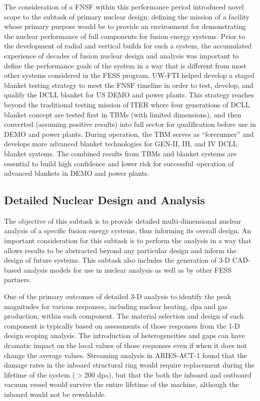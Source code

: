 The consideration of a \gls{FNSF} within this performance period introduced
novel scope to the subtask of primary nuclear design: defining the mission of
a facility whose primary purpose would be to provide an environment for
demonstrating the nuclear performance of full components for fusion energy
systems.  Prior to the development of radial and vertical builds for such a
system, the accumulated experience of decades of fusion nuclear design and
analysis was important to define the performance goals of the system in a way
that is different from most other systems considered in the \gls{FESS}
program.  \gls{UW-FTI} helped develop a staged blanket testing strategy to
meet the \gls{FNSF} timeline in order to test, develop, and qualify the
\gls{DCLL} blanket for US DEMO and power plants. This strategy reaches beyond
the traditional testing mission of ITER where four generations of \gls{DCLL}
blanket concept are tested first in \glspl{TBM} (with limited dimensions), and
then converted (assuming positive results) into full sector for qualification
before use in DEMO and power plants. During operation, the \gls{TBM} serves as
“forerunner” and develops more advanced blanket technologies for GEN-II, III,
and IV \gls{DCLL} blanket systems.  The combined results from \glspl{TBM} and
blanket systems are essential to build high confidence and lower risk for
successful operation of advanced blankets in DEMO and power plants.

\subsection{Detailed Nuclear Design and Analysis}

The objective of this subtask is to provide detailed multi-dimensional nuclear
analysis of a specific fusion energy systems, thus informing its overall
design.  An important consideration for this subtask is to perform the
analysis in a way that allows results to be abstracted beyond any particular
design and inform the design of future systems.  This subtask also includes
the generation of 3-D CAD-based analysis models for use in nuclear analysis as
well as by other \gls{FESS} partners.

One of the primary outcomes of detailed 3-D analysis to identify the peak
magnitudes for various responses, including nuclear heating, dpa and gas
production, within each component.  The material selection and design of each
component is typically based on assessments of those responses from the 1-D
design scoping analysis.  The introduction of heterogeneities and gaps can
have dramatic impact on the local values of those responses even if when it
does not change the average values.  Streaming analysis in ARIES-ACT-1 found
that the damage rates in the inboard structural ring would require replacement
during the lifetime of the system ($>$200 dpa), but that the both the inboard
and outboard vacuum vessel would survive the entire lifetime of the machine,
although the inboard would not be reweldable.

